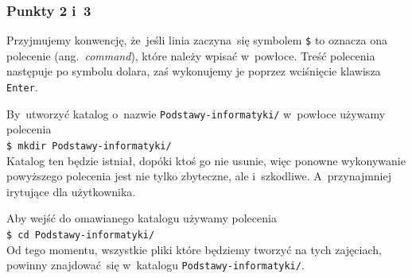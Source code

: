 \documentclass[10pt,t]{beamer}
\begin{document}
\begin{frame}
  \frametitle{Punkty 2 i~3}


  Przyjmujemy konwencję, że~jeśli linia zaczyna~się symbolem
  \texttt{\$} to oznacza ona polecenie (ang.~\textit{command}), które
  należy wpisać w~powłoce. Treść polecenia następuje po symbolu dolara,
  zaś wykonujemy je poprzez wciśnięcie klawisza \texttt{Enter}.

  By~utworzyć katalog o~nazwie \texttt{Podstawy-informatyki/} w~powłoce
  używamy polecenia \\
  \texttt{\$ mkdir Podstawy-informatyki/} \\
  Katalog ten będzie istniał, dopóki ktoś go nie usunie, więc ponowne
  wykonywanie powyższego polecenia jest nie tylko zbyteczne, ale
  i~szkodliwe. A~przynajmniej irytujące dla użytkownika.

  Aby wejść do omawianego katalogu używamy polecenia \\
  \texttt{\$ cd Podstawy-informatyki/} \\
  Od tego momentu, wszystkie pliki które będziemy tworzyć na tych zajęciach,
  powinny znajdować~się w~katalogu \texttt{Podstawy-informatyki/}.

\end{frame}
\end{document}
